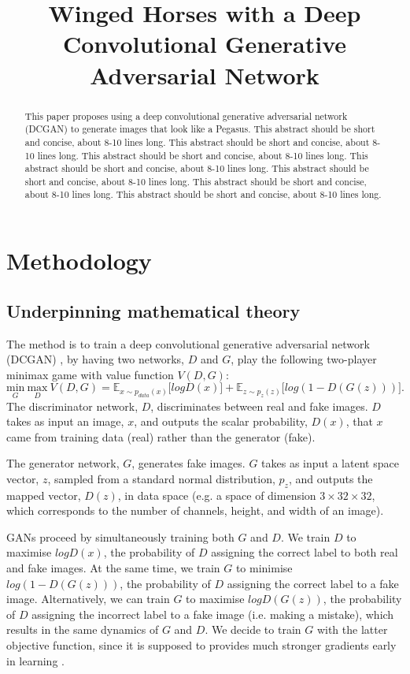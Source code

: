 \documentclass{article}
\title{Winged Horses with a Deep Convolutional Generative Adversarial Network}
\begin{document}
\maketitle
\begin{abstract}
    This paper proposes using a deep convolutional generative adversarial network (DCGAN) to generate images that look like a Pegasus. This abstract should be short and concise, about 8-10 lines long. This abstract should be short and concise, about 8-10 lines long. This abstract should be short and concise, about 8-10 lines long. This abstract should be short and concise, about 8-10 lines long. This abstract should be short and concise, about 8-10 lines long. This abstract should be short and concise, about 8-10 lines long. This abstract should be short and concise, about 8-10 lines long.
\end{abstract}

\section{Methodology}
\subsection{Underpinning mathematical theory}
The method is to train a deep convolutional generative adversarial network (DCGAN) \cite{article}, by having two networks, $D$ and $G$, play the following two-player minimax game with value function $V(D, G)$: 
\begin{equation}
    \underset{G}{\text{min}} \ \underset{D}{\text{max}} \ V(D,G) = \mathbb{E}_{x\sim p_{data}(x)}\big[logD(x)\big] + \mathbb{E}_{z\sim p_{z}(z)}\big[log(1-D(G(z)))\big].
\end{equation}
The discriminator network, $D$, discriminates between real and fake images. $D$ takes as input an image, $x$, and outputs the scalar probability, $D(x)$, that $x$ came from training data (real) rather than the generator (fake). 

The generator network, $G$, generates fake images. $G$ takes as input a latent space vector, $z$, sampled from a standard normal distribution, $p_z$, and outputs the mapped vector, $D(z)$, in data space (e.g. a space of dimension $3 \times 32 \times 32$, which corresponds to the number of channels, height, and width of an image). 

GANs proceed by simultaneously training both $G$ and $D$. We train $D$ to maximise $logD(x)$, the probability of $D$ assigning the correct label to both real and fake images. At the same time, we train $G$ to minimise $log(1-D(G(z)))$, the probability of $D$ assigning the correct label to a fake image. Alternatively, we can train $G$ to maximise $logD(G(z))$, the probability of $D$ assigning the incorrect label to a fake image (i.e. making a mistake), which results in the same dynamics of $G$ and $D$. We decide to train $G$ with the latter objective function, since it is supposed to provides much stronger gradients early in learning \cite{NIPS2014_5ca3e9b1}.
\end{document}
